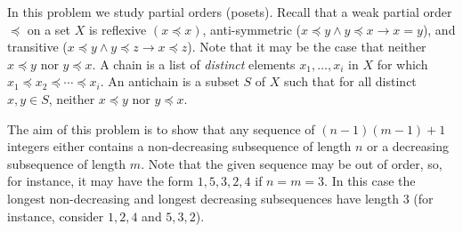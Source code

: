 \documentclass[12pt,twoside]{article}
\begin{document}
\begin{problem}{20}
In this problem we study partial orders (posets). Recall that a weak partial order $\preceq$ on a set $X$ is reflexive $(x \preceq x)$, anti-symmetric ($x \preceq y \wedge y \preceq x \rightarrow x = y$), and transitive ($x \preceq y \wedge y \preceq z \rightarrow x \preceq z$). Note that it may be the case that neither $x \preceq y$ nor $y \preceq x$. A chain is a list of {\it distinct} elements $x_1, \ldots, x_i$ in $X$ for which $x_1 \preceq x_2 \preceq \cdots \preceq x_i$. An antichain is a subset $S$ of $X$ such that for all distinct $x, y \in S$, neither $x \preceq y$ nor $y \preceq x$. 

The aim of this problem is to show that any sequence of $(n-1)(m-1) + 1$ integers either contains a non-decreasing subsequence of length $n$ or a decreasing subsequence of length $m$. Note that the given sequence may be out of order, so, for instance, it may have the form $1, 5, 3, 2, 4$ if $n = m = 3$. In this case the longest non-decreasing and longest decreasing subsequences have length $3$ (for instance, consider $1, 2, 4$ and $5, 3, 2$).



\bparts


\end{problem}
\end{document}
